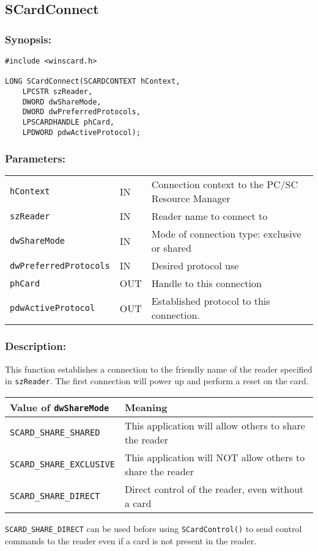 \documentclass[a4paper,12pt]{article}
\newcommand{\synopsis}{\subsubsection{Synopsis:}}
\newcommand{\parameters}{\subsubsection{Parameters:}}
\newcommand{\desc}{\subsubsection{Description:}}
\begin{document}
\subsection{SCardConnect}

\synopsis
\begin{verbatim}
#include <winscard.h>

LONG SCardConnect(SCARDCONTEXT hContext,
    LPCSTR szReader,
    DWORD dwShareMode,
    DWORD dwPreferredProtocols,
    LPSCARDHANDLE phCard,
    LPDWORD pdwActiveProtocol);
\end{verbatim}

\parameters

\begin{tabular}{lll}
\texttt{hContext} & IN & Connection context to the PC/SC Resource Manager\\
\texttt{szReader} & IN & Reader name to connect to\\
\texttt{dwShareMode} & IN & Mode of connection type: exclusive or shared\\
\texttt{dwPreferredProtocols} & IN & Desired protocol use\\
\texttt{phCard} & OUT & Handle to this connection\\
\texttt{pdwActiveProtocol} & OUT & Established protocol to this connection.
\end{tabular}

\desc

This function establishes a connection to the friendly name of
the reader specified in \texttt{szReader}. The first connection will
power up and perform a reset on the card.

\begin{tabular}{|l|l|}
\hline
Value of \texttt{dwShareMode} & Meaning\\
\hline
\hline
\texttt{SCARD\_SHARE\_SHARED} & This application will allow others to share the reader \\
\hline
\texttt{SCARD\_SHARE\_EXCLUSIVE} & This application will NOT allow
others to share the reader \\
\hline
\texttt{SCARD\_SHARE\_DIRECT} & Direct control of the reader, even
without a card \\
\hline
\end{tabular}

\texttt{SCARD\_SHARE\_DIRECT} can be used before using
\texttt{SCardControl()} to send control commands to the reader even if a
card is not present in the reader.
\end{document}
